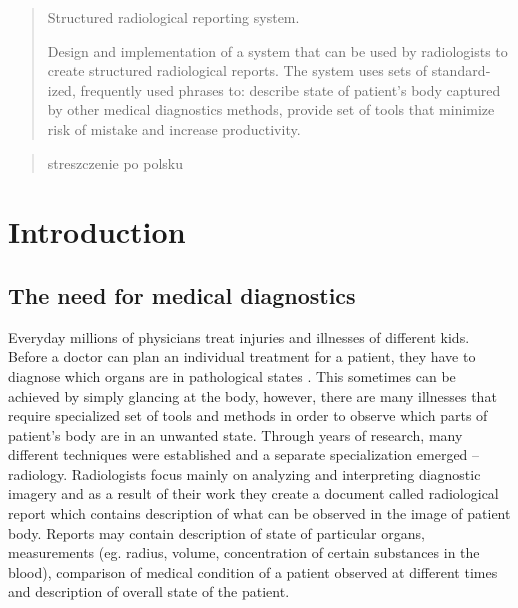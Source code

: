 \documentclass[12pt, twoside, openany]{report}
\theoremstyle{definition}
\begin{document}
\thispagestyle{empty}
\newpage
\pagestyle{headings}
\setcounter{page}{1}
\begin{otherlanguage}{british}
\begin{abstract}
Structured radiological reporting system.

Design and implementation of a system that can be used by radiologists to create structured radiological reports. The system uses sets of standardized, frequently used phrases to: describe state of patient's body captured by other medical diagnostics methods, provide set of tools that minimize risk of mistake and increase productivity. 
\end{abstract}
\end{otherlanguage}

\begin{otherlanguage}{polish}
\begin{abstract}
streszczenie po polsku
\end{abstract}
\end{otherlanguage}

\tableofcontents
\clearpage







\chapter{Introduction}
\section{The need for medical diagnostics}
Everyday millions of physicians treat injuries and illnesses of different kids. Before a doctor can plan an individual treatment for a patient, they have to diagnose which organs are in pathological states \cite{bls}. This sometimes can be achieved by simply glancing at the body, however, there are many illnesses that require specialized set of tools and methods in order to observe which parts of patient's body are in an unwanted state. Through years of research, many different techniques were established and a separate specialization emerged -- radiology. Radiologists focus mainly on analyzing and interpreting diagnostic imagery and as a result of their work they create a document called radiological report which contains description of what can be observed in the image of patient body. Reports may contain description of state of particular organs, measurements (eg. radius, volume, concentration of certain substances in the blood), comparison of medical condition of a patient observed at different times and description of overall state of the patient. \\
\end{document}
